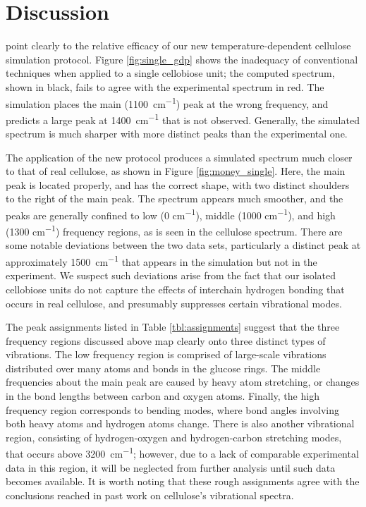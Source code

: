 
\chapter{Discussion}

 point clearly to the relative efficacy of our new temperature-dependent cellulose simulation protocol. Figure \ref{fig:single_gdp} shows the inadequacy of conventional techniques when applied to a single cellobiose unit; the computed spectrum, shown in black, fails to agree with the experimental spectrum in red. The simulation places the main (\SI{1100}{cm^{-1}}) peak at the wrong frequency, and predicts a large peak at \SI{1400}{cm^{-1}} that is not observed. Generally, the simulated spectrum is much sharper with more distinct peaks than the experimental one.

The application of the new protocol produces a simulated spectrum much closer to that of real cellulose, as shown in Figure \ref{fig:money_single}. Here, the main peak is located properly, and has the correct shape, with two distinct shoulders to the right of the main peak. The spectrum appears much smoother, and the peaks are generally confined to low (0 \si{cm^{-1}}), middle (1000 \si{cm^{-1}}), and high (1300 \si{cm^{-1}}) frequency regions, as is seen in the cellulose spectrum. There are some notable deviations between the two data sets, particularly a distinct peak at approximately \SI{1500}{cm^{-1}} that appears in the simulation but not in the experiment. We suspect such deviations arise from the fact that our isolated cellobiose units do not capture the effects of interchain hydrogen bonding that occurs in real cellulose, and presumably suppresses certain vibrational modes.

The peak assignments listed in Table \ref{tbl:assignments} suggest that the three frequency regions discussed above map clearly onto three distinct types of vibrations. The low frequency region is comprised of large-scale vibrations distributed over many atoms and bonds in the glucose rings. The middle frequencies about the main peak are caused by heavy atom stretching, or changes in the bond lengths between carbon and oxygen atoms. Finally, the high frequency region corresponds to bending modes, where bond angles involving both heavy atoms and hydrogen atoms change. There is also another vibrational region, consisting of hydrogen-oxygen and hydrogen-carbon stretching modes, that occurs above \SI{3200}{cm^{-1}}; however, due to a lack of comparable experimental data in this region, it will be neglected from further analysis until such data becomes available. It is worth noting that these rough assignments agree with the conclusions reached in past work on cellulose's vibrational spectra\cite{RefWorks:39}.

